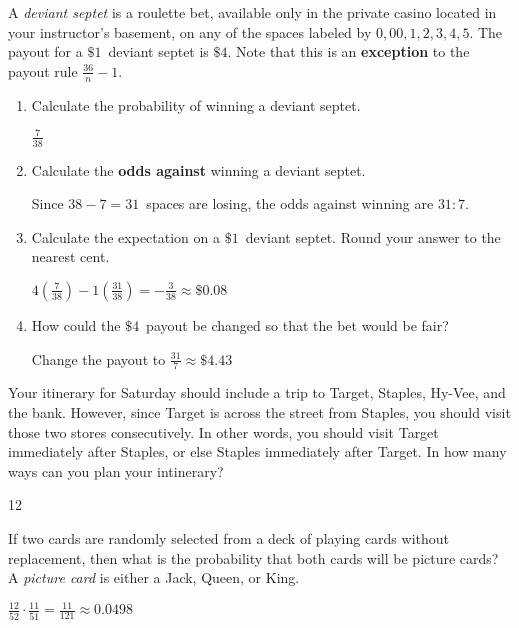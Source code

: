 \documentclass[answers,addpoints,12pt]{exam}
\begin{document}
\begin{questions}
\begin{solution}
\end{solution}

\question[10]
A {\em deviant septet} is a roulette bet,
available only in the private casino located
in your instructor's basement, on any of the spaces labeled by
$0,00,1,2,3,4,5$. The payout for a $\$1$~deviant septet
is $\$4$.
Note that this is an {\bf exception} to the
payout rule $\frac{36}{n}-1$.
\begin{enumerate}
\item Calculate the probability of winning a deviant septet.
\begin{solution} $\frac{7}{38}$
\end{solution}
\item Calculate the {\bf odds against} winning a deviant septet.
\begin{solution}
Since $38-7=31$~spaces are losing, the odds against winning
are $31:7$.
\end{solution}
\item Calculate the expectation on a $\$1$~deviant septet.
Round your answer to the nearest cent.
\begin{solution}
$4\left(\frac{7}{38}\right)-1\left(\frac{31}{38}\right)=-\frac{3}{38}
\approx\$0.08$
\end{solution}
\item How could the $\$4$~payout
be changed so that the bet would be fair?
\begin{solution}
Change the payout to $\frac{31}{7}\approx\$ 4.43$
\end{solution}
\end{enumerate}

\question[15] Your itinerary for Saturday should
include a trip to Target, Staples, Hy-Vee, and the bank.
However, since Target is across the street from Staples,
you should visit those two stores consecutively. In other
words, you should visit Target immediately after Staples, or else
Staples immediately after Target. In how many ways
can you plan your intinerary?
\begin{solution}12\end{solution}

\question[10] If two cards are randomly selected from a deck
of playing cards without replacement,
then what is the probability that both cards
will be picture cards?  A {\em picture card} is either a Jack, Queen, or King.
\begin{solution}
$\frac{12}{52}\cdot\frac{11}{51}=\frac{11}{121}\approx 0.0498$
\end{solution}


\end{questions}
\end{document}
